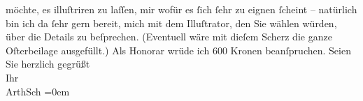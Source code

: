 \begin{ledgroupsized}[t]{13cm}
               möchte, es illuſtriren zu laſſen, \introOben{}mir\introOben{} wofür es ſich ſehr zu eignen ſcheint
               – natürlich bin ich da{\geminationn} ſehr gern bereit,  mich mit dem Illuſtrator, den Sie wählen würden,
               über die Details zu beſprechen. (Eventuell wäre mit dieſem Scherz die ganze Oſterbeilage ausgefüllt.) Als Honorar wrüde ich 600 Kronen
               beanſpruchen. \pend
           \pstart
           Seien Sie herzlich gegrüßt {\\[\baselineskip]}Ihr {\\[\baselineskip]}\spacefill\mbox{ArthSch}\pend
           \leftskip=0em{}
         
         \endnumbering{}\end{ledgroupsized}\begin{anhang}\end{anhang}\newcommand{\dateiname}{L02997}\newcommand{\titel}{Arthur Schnitzler an Felix Salten, 8. 2. 1905}\newcommand{\editorInnen}{Martin Anton Müller und Laura Untner}
      